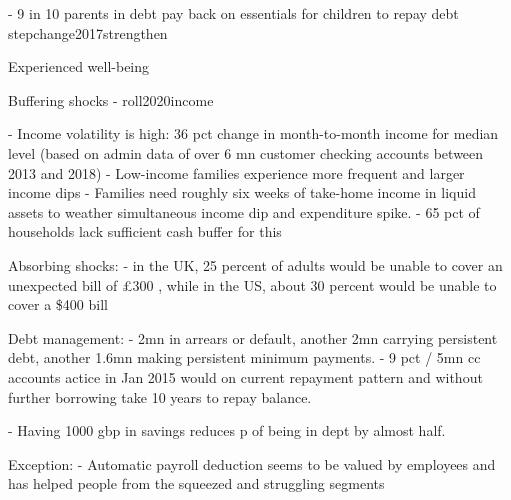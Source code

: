 - 9 in 10 parents in debt pay back on essentials for children to repay debt
stepchange2017strengthen

Experienced well-being

Buffering shocks
- roll2020income

\citet{jpmorgan2019weathering}
- Income volatility is high: 36 pct change in month-to-month income for median
level (based on admin data of over 6 mn customer checking accounts between 2013
and 2018)
- Low-income families experience more frequent and larger income dips
- Families need roughly six weeks of take-home income in liquid assets to
weather simultaneous income dip and expenditure spike.
- 65 pct of households lack sufficient cash buffer for this







Absorbing shocks:
- in the UK, 25 percent of adults would be unable to cover an unexpected
bill of \pounds300 \citep{philipps2021supporting}, while in the US, about 30
percent would be unable to cover a \$400 bill \citep{fed2022economic}

Debt management:
\citet{fca2016credit}
- 2mn in arrears or default, another 2mn carrying persistent debt, another
1.6mn making persistent minimum payments.
- 9 pct / 5mn cc accounts actice in Jan 2015 would on current repayment pattern
and without further borrowing take 10 years to repay balance.



\citet{stepchange2017strengthening}
- Having 1000 gbp in savings reduces p of being in dept by almost half. 



Exception:
\citet{philipps2021supporting}
- Automatic payroll deduction seems to be valued by employees and has helped
people from the squeezed and struggling segments 









